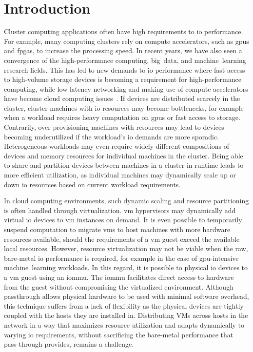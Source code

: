 \chapter{Introduction}\label{chapter:intro}
Cluster computing applications often have high requirements to \gls{io} performance.
%
For example, many computing clusters rely on compute accelerators, such as \glspl{gpu} and \glspl{fpga}, to increase the processing speed.
%
In recent years, we have also seen a convergence of the high-performance computing, big~data, and machine~learning research fields.
%
This has led to new demands to \gls{io} performance where fast access to high-volume storage devices is becoming a requirement for high-performance computing, while low latency networking and making use of compute accelerators have become cloud computing issues~\cite{Trivedi2011,Coates2013,Taherkordi2018}.
%
If devices are distributed scarcely in the cluster, cluster machines with \gls{io} resources may become bottlenecks, for example when a workload requires heavy computation on \glspl{gpu} or fast access to storage.
%
Contrarily, over-provisioning machines with resources may lead to devices becoming underutilized if the workload's \gls{io} demands are more sporadic.
%
Heterogeneous workloads may even require widely different compositions of devices and memory resources for individual machines in the cluster.
%
Being able to share and partition devices between machines in a cluster in runtime leads to more efficient utilization, as individual machines may dynamically scale up or down \gls{io} resources based on current workload requirements.



In cloud computing environments, such dynamic scaling and resource partitioning is often handled through virtualization. 
\Gls{vm} \glspl{hypervisor} may dynamically add virtual \gls{io} devices to \gls{vm} instances on demand.
%
It is even possible to temporarily suspend computation to migrate \glspl{vm} to \gls{host} machines with more hardware resources available, should the requirements of a \gls{vm} \gls{guest} exceed the available local resources.
%
However, resource virtualization may not be viable when the raw, bare-metal \gls{io} performance is required, for example in the case of \gls{gpu}-intensive machine~learning workloads.
%
In this regard, it is possible to  physical \gls{io} devices to a \gls{vm} \gls{guest} using an \gls{iommu}.
%
The \gls{iommu} facilitates direct access to hardware from the \gls{guest} without compromising the virtualized environment.
%
Although \gls{passthrough} allows physical hardware to be used with minimal software overhead, this technique suffers from a lack of flexibility as the physical devices are tightly coupled with the hosts they are installed in.
%
Distributing VMs across hosts in the network in a way that maximizes resource utilization and adapts dynamically to varying \gls{io} requirements, without sacrificing the bare-metal performance that pass-through provides, remains a challenge.



